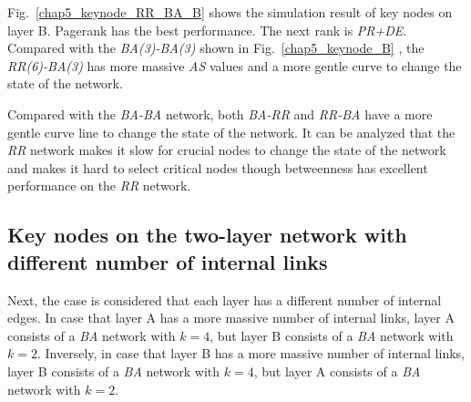 Fig.~\ref{chap5_keynode_RR_BA_B} shows the simulation result of key nodes on layer B. Pagerank has the best performance. The next rank is \textit{PR+DE}.  Compared with the \textit{BA(3)-BA(3)} shown in Fig.~\ref{chap5_keynode_B} , the \textit{RR(6)-BA(3)} has more massive \textit{AS} values and a more gentle curve to change the state of the network. 

Compared with the \textit{BA-BA} network, both \textit{BA-RR} and \textit{RR-BA} have a more gentle curve line to change the state of the network. It can be analyzed that the \textit{RR} network makes it slow for crucial nodes to change the state of the network and makes it hard to select critical nodes though betweenness has excellent performance on the \textit{RR} network.\\  

\subsection{Key nodes on the two-layer network with different number of internal links}
Next, the case is considered that each layer has a different number of internal edges. In case that layer A has a more massive number of internal links, layer A consists of a \textit{BA} network with $k=4$, but layer B consists of a \textit{BA} network with $k=2$. Inversely, in case that layer B has a more massive number of internal links, layer B consists of a \textit{BA} network with $k=4$, but layer A consists of a \textit{BA} network with $k=2$. 

